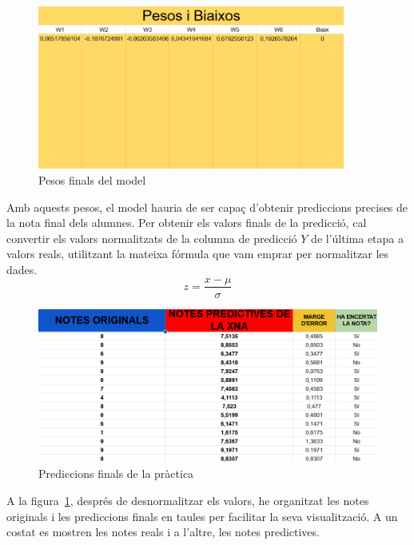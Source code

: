 \vspace*{1truecm}
\begin{figure}[H]
    \centering
    \includegraphics[width=0.9\textwidth]{./figures/Pesos_finals.png}
    \caption{Pesos finals del model}
\end{figure}
Amb aquests pesos, el model hauria de ser capaç d’obtenir prediccions precises de la nota final dels alumnes. Per obtenir els valors finals de la predicció, cal convertir els valors normalitzats de la columna de predicció $Y$ de l’última etapa a valors reals, utilitzant la mateixa fórmula que vam emprar per normalitzar les dades.
$$z = \frac{x - \mu}{\sigma}$$

\vspace*{1truecm}
\begin{figure}[h]
    \centering
    \includegraphics[width=1\textwidth]{./figures/Resultat_final.png}
    \caption{Prediccions finals de la pràctica}
    \label{f:resulat_full}
\end{figure}

\vspace*{1truecm}
A la figura~\ref{f:resulat_full}, després de desnormalitzar els valors, he organitzat les notes originals i les prediccions finals en taules per facilitar la seva visualització. A un costat es mostren les notes reals i a l’altre, les notes predictives.\\

